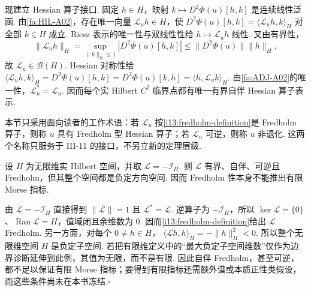 现建立 Hessian 算子接口. 固定 \(\displaystyle h\in H\)，映射
\(\displaystyle k\longmapsto D^2\Phi(u)[h,k]\)
是连续线性泛函. 由\autoref{fa:HIL-A02}，存在唯一向量 \(\displaystyle\mathcal L_uh\in H\)，使
\(\displaystyle D^2\Phi(u)[h,k] = \langle\mathcal L_uh,k\rangle_H\)
对全部 \(\displaystyle k\in H\) 成立. Riesz 表示的唯一性与双线性性给 \(\displaystyle h\mapsto\mathcal L_uh\) 线性. 又由有界性，
\[
\|\mathcal L_uh\|_H
=
\sup_{\|k\|_H\leqslant1}
|D^2\Phi(u)[h,k]|
\leqslant
\|D^2\Phi(u)\|\|h\|_H,
\]
故 \(\displaystyle\mathcal L_u\in\mathcal B(H)\). Hessian 对称性给
\(\displaystyle \langle\mathcal L_uh,k\rangle_H = D^2\Phi(u)[h,k] = D^2\Phi(u)[k,h] = \langle h,\mathcal L_uk\rangle_H\).
由\autoref{fa:ADJ-A02}的唯一性，\(\displaystyle\mathcal L_u^*=\mathcal L_u\). 因而每个实 Hilbert \(\displaystyle C^2\) 临界点都有唯一有界自伴 Hessian 算子表示.

本节只采用面向读者的工作术语：若 \(\displaystyle\mathcal L_u\) 按\autoref{i13:fredholm-definition}是 Fredholm 算子，则称 \(\displaystyle u\) 具有 Fredholm 型 Hessian 算子；若 \(\displaystyle\mathcal L_u\) 可逆，则称 \(\displaystyle u\) 非退化. 这两个名称只服务于 III-11 的接口，不另立新的定理层级.

\begin{FACounterexample}\label{iii11:fredholm-minus-identity}
设 \(\displaystyle H\) 为无限维实 Hilbert 空间，并取 \(\displaystyle\mathcal L=-\mathcal I_H\). 则 \(\displaystyle\mathcal L\) 有界、自伴、可逆且 Fredholm，但其整个空间都是负定方向空间. 因而 Fredholm 性本身不能推出有限 Morse 指标.
\end{FACounterexample}

\begin{FAProof}
由 \(\displaystyle\mathcal L=-\mathcal I_H\) 直接得到 \(\displaystyle\|\mathcal L\|=1\) 且 \(\displaystyle\mathcal L^*=\mathcal L\). 逆算子为 \(\displaystyle-\mathcal I_H\)，所以 \(\displaystyle\ker\mathcal L=\{0\}\)、\(\displaystyle\operatorname{Ran}\mathcal L=H\)，值域闭且余维数为 \(\displaystyle0\). 因而\autoref{i13:fredholm-definition}给出 \(\displaystyle\mathcal L\) Fredholm. 另一方面，对每个 \(\displaystyle0\neq h\in H\)，
\(\displaystyle \langle\mathcal Lh,h\rangle_H = -\|h\|_H^2 <0\).
所以整个无限维空间 \(\displaystyle H\) 是负定子空间. 若把有限维定义中的“最大负定子空间维数”仅作为边界诊断延伸到此例，其值为无限，而不是有限. 因此自伴 Fredholm，甚至可逆，都不足以保证有限 Morse 指标；要得到有限指标还需额外谱或本质正性类假设，而这些条件尚未在本书冻结.\hfill\(\square\)
\end{FAProof}

